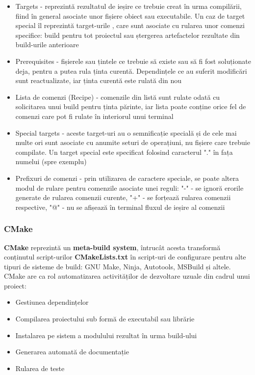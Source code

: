 \begin{itemize}
    \item Targets - reprezintă rezultatul de ieșire ce trebuie creat în urma compilării, fiind în general
    asociate unor fișiere obiect sau executabile. Un caz de target special îl reprezintă target-urile 
    , care sunt asociate cu rularea unor comenzi specifice: build pentru tot proiectul sau 
    ștergerea artefactelor rezultate din build-urile anterioare
    \item Prerequisites - fișierele sau țintele ce trebuie să existe sau să fi fost soluționate deja, pentru 
    a putea rula ținta curentă. Dependințele ce au suferit modificări sunt reactualizate, iar ținta curentă
    este rulată din nou
    \item Lista de comenzi (Recipe) - comenzile din listă sunt rulate odată cu solicitarea unui build pentru ținta 
    părinte, iar lista poate conține orice fel de comenzi care pot fi rulate în interiorul unui terminal
    \item Special targets - aceste target-uri au o semnificație specială și de cele mai multe ori sunt asociate cu
    anumite seturi de operațiuni, nu fișiere care trebuie compilate. Un target special este specificat folosind
    caracterul "." în fața numelui (spre exemplu)
    \item Prefixuri de comenzi - prin utilizarea de caractere speciale, se poate altera modul de rulare pentru comenzile
    asociate unei reguli: "-" - se ignoră erorile generate de rularea comenzii curente, 
    "+" - se forțează rularea comenzii respective, "@" - nu se afișează în terminal fluxul de ieșire al comenzii
\end{itemize}

\subsubsection{CMake\cite{swidzinski2022modern}}

\textbf{CMake} reprezintă un \textbf{meta-build system}, întrucât acesta transformă conținutul script-urilor \textbf{CMakeLists.txt}
în script-uri de configurare pentru alte tipuri de sisteme de build: GNU Make, Ninja, Autotools, MSBuild și altele.
CMake are ca rol automatizarea activităților de dezvoltare uzuale din cadrul unui proiect:

\begin{itemize}
    \item Gestiunea dependințelor
    \item Compilarea proiectului sub formă de executabil sau librărie
    \item Instalarea pe sistem a modulului rezultat în urma build-ului
    \item Generarea automată de documentație
    \item Rularea de teste
\end{itemize}

